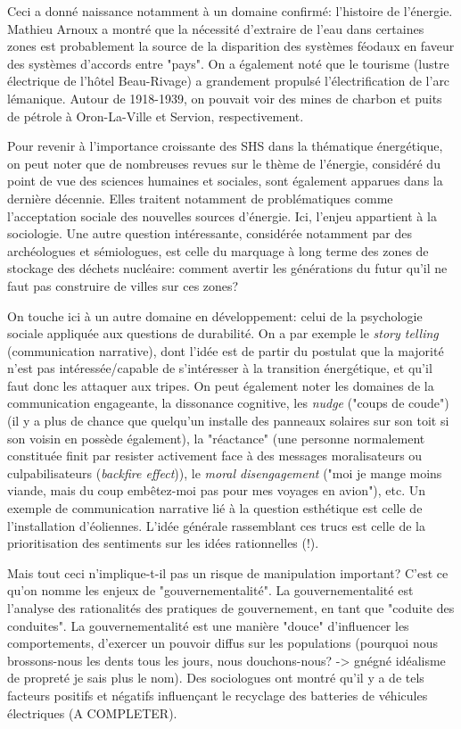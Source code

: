 \documentclass{article}
\begin{document}
 Ceci a donné naissance notamment à un domaine confirmé: l'histoire de l'énergie. Mathieu Arnoux a montré que la nécessité d'extraire de l'eau dans certaines zones est probablement la source de la disparition des systèmes féodaux en faveur des systèmes d'accords entre "pays". On a également noté que le tourisme (lustre électrique de l'hôtel Beau-Rivage) a grandement propulsé l'électrification de l'arc lémanique. Autour de 1918-1939, on pouvait voir des mines de charbon et puits de pétrole à Oron-La-Ville et Servion, respectivement. \par
 Pour revenir à l'importance croissante des SHS dans la thématique énergétique, on peut noter que de nombreuses revues sur le thème de l'énergie, considéré du point de vue des sciences humaines et sociales, sont également apparues dans la dernière décennie. Elles traitent notamment de problématiques comme l'acceptation sociale des nouvelles sources d'énergie. Ici, l'enjeu appartient à la sociologie. Une autre question intéressante, considérée notamment par des archéologues et sémiologues, est celle du marquage à long terme des zones de stockage des déchets nucléaire: comment avertir les générations du futur qu'il ne faut pas construire de villes sur ces zones? \par
 On touche ici à un autre domaine en développement: celui de la psychologie sociale appliquée aux questions de durabilité. On a par exemple le \emph{story telling} (communication narrative), dont l'idée est de partir du postulat que la majorité n'est pas intéressée/capable de s'intéresser à la transition énergétique, et qu'il faut donc les attaquer aux tripes. On peut également noter les domaines de la communication engageante, la dissonance cognitive, les \emph{nudge} ("coups de coude") (il y a plus de chance que quelqu'un installe des panneaux solaires sur son toit si son voisin en possède également), la "réactance" (une personne normalement constituée finit par resister activement face à des messages moralisateurs ou culpabilisateurs (\emph{backfire effect})), le \emph{moral disengagement} ("moi je mange moins viande, mais du coup embêtez-moi pas pour mes voyages en avion"), etc. Un exemple de communication narrative lié à la question esthétique est celle de l'installation d'éoliennes. L'idée générale rassemblant ces trucs est celle de la prioritisation des sentiments sur les idées rationnelles (!). \par
 Mais tout ceci n'implique-t-il pas un risque de manipulation important? C'est ce qu'on nomme les enjeux de "gouvernementalité". La gouvernementalité est l'analyse des rationalités des pratiques de gouvernement, en tant que "coduite des conduites". La gouvernementalité est une manière "douce" d'influencer les comportements, d'exercer un pouvoir diffus sur les populations (pourquoi nous brossons-nous les dents tous les jours, nous douchons-nous? -> gnégné idéalisme de propreté je sais plus le nom). Des sociologues ont montré qu'il y a de tels facteurs positifs et négatifs influençant le recyclage des batteries de véhicules électriques (A COMPLETER). \par
\end{document}
